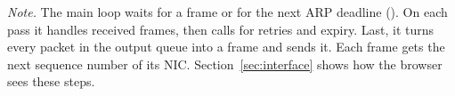 \emph{Note.} The main loop waits for a frame or for the next ARP deadline (). On each pass it handles received frames, then calls  for retries and expiry. Last, it turns every packet in the output queue into a frame and sends it. Each frame gets the next sequence number of its NIC. Section~\ref{sec:interface} shows how the browser sees these steps.

\endgroup
